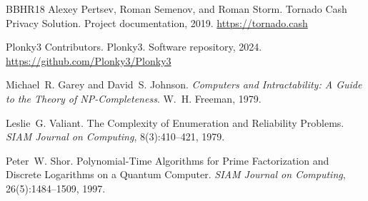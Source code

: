 \documentclass{iacrcc}
\begin{document}
\begin{thebibliography}{BBHR18}
Alexey Pertsev, Roman Semenov, and Roman Storm.
\newblock Tornado Cash Privacy Solution.
\newblock Project documentation, 2019.
\newblock \url{https://tornado.cash}

Plonky3 Contributors.
\newblock Plonky3.
\newblock Software repository, 2024.
\newblock \url{https://github.com/Plonky3/Plonky3}

Michael~R. Garey and David~S. Johnson.
\newblock \emph{Computers and Intractability: A Guide to the Theory of NP-Completeness}.
\newblock W.~H. Freeman, 1979.

Leslie~G. Valiant.
\newblock The Complexity of Enumeration and Reliability Problems.
\newblock \emph{SIAM Journal on Computing}, 8(3):410--421, 1979.

Peter~W. Shor.
\newblock Polynomial-Time Algorithms for Prime Factorization and Discrete Logarithms on a Quantum Computer.
\newblock \emph{SIAM Journal on Computing}, 26(5):1484--1509, 1997.

\end{thebibliography}
\end{document}
